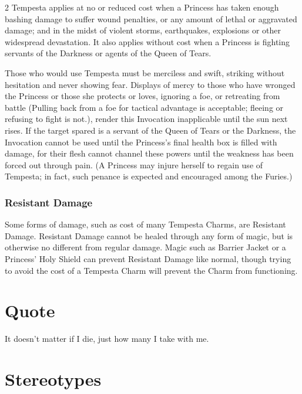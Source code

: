\begin{multicols}{2}
Tempesta applies at no or reduced cost when a Princess has taken enough bashing damage to suffer wound penalties, or any amount of lethal or aggravated damage; and in the midst of violent storms, earthquakes, explosions or other widespread devastation. It also applies without cost when a Princess is fighting servants of the Darkness or agents of the Queen of Tears.

Those who would use Tempesta must be merciless and swift, striking without hesitation and never showing fear. Displays of mercy to those who have wronged the Princess or those she protects or loves, ignoring a foe, or retreating from battle (Pulling back from a foe for tactical advantage is acceptable; fleeing or refusing to fight is not.), render this Invocation inapplicable until the sun next rises. If the target spared is a servant of the Queen of Tears or the Darkness, the Invocation cannot be used until the Princess's final health box is filled with damage, for their flesh cannot channel these powers until the weakness has been forced out through pain. (A Princess may injure herself to regain use of Tempesta; in fact, such penance is expected and encouraged among the Furies.) 

\begin{mybox}

\subsubsection*{Resistant Damage}

Some forms of damage, such as cost of many Tempesta Charms, are Resistant Damage. Resistant Damage cannot be healed through any form of magic, but is otherwise no different from regular damage. Magic such as Barrier Jacket or a Princess' Holy Shield can prevent Resistant Damage like normal, though trying to avoid the cost of a Tempesta Charm will prevent the Charm from functioning. 

\end{mybox}

\section*{Quote}

It doesn't matter if I die, just how many I take with me. 

\section*{Stereotypes}


\end{multicols}
